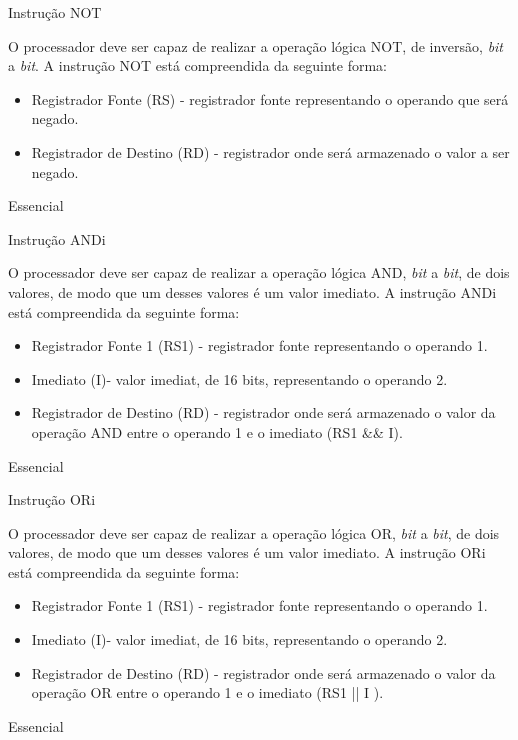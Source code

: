 \documentclass{article}
\begin{document}
\begin{functional}
      \requirement
      {Instrução NOT}
      {O processador deve ser capaz de realizar a operação lógica NOT, de inversão, \textit{bit} a \textit{bit}.
      A instrução NOT está compreendida da seguinte forma:\\
       \begin{itemize}
	 \item Registrador Fonte (RS) - registrador fonte representando o operando que será negado.
         \item Registrador de Destino (RD) - registrador onde será armazenado o valor a ser negado.
         \end{itemize}
         }
      {Essencial}
      
      \requirement
      {Instrução ANDi}
      {O processador deve ser capaz de realizar a operação lógica AND, \textit{bit} a \textit{bit}, de dois valores, de modo que um desses valores é um valor imediato.
      A instrução ANDi está compreendida da seguinte forma:\\
       \begin{itemize}
        \item Registrador Fonte 1 (RS1) - registrador fonte representando o operando 1.
        \item Imediato (I)- valor imediat, de 16 bits, representando o operando 2.
        \item Registrador de Destino (RD) - registrador onde será armazenado o valor da operação AND entre o operando 1 e o imediato (RS1 \&\& I).
       \end{itemize}
       }
      {Essencial}
      
      \requirement
      {Instrução ORi}
      {O processador deve ser capaz de realizar a operação lógica OR, \textit{bit} a \textit{bit}, de dois valores, de modo que um desses valores é um valor imediato.
      A instrução ORi está compreendida da seguinte forma:\\
       \begin{itemize}
        \item Registrador Fonte 1 (RS1) - registrador fonte representando o operando 1.
        \item Imediato (I)- valor imediat, de 16 bits, representando o operando 2.
        \item Registrador de Destino (RD) - registrador onde será armazenado o valor da operação OR entre o operando 1 e o imediato (RS1 || I ).
       \end{itemize}
       }
      {Essencial}
      
	\end{functional}
\end{document}
